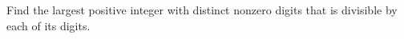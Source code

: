 Find the largest positive integer with distinct nonzero digits that is divisible by each of its digits.

